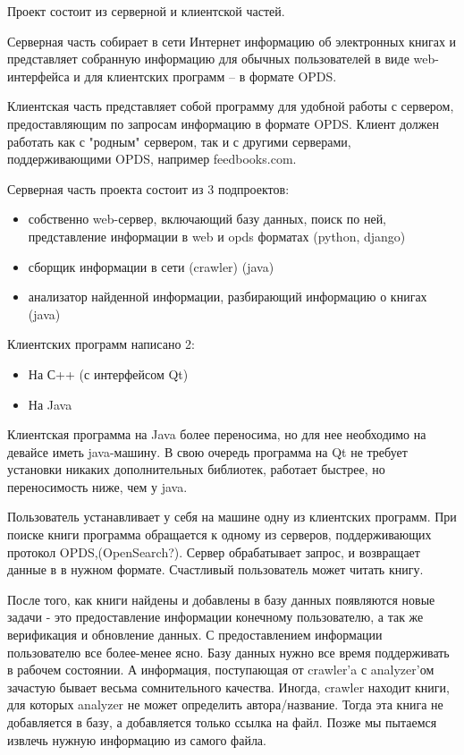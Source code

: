 \documentclass[a4paper]{report}
\begin{document}
Проект состоит из серверной и клиентской частей.

Серверная часть собирает в сети Интернет информацию об электронных книгах и представляет собранную информацию для обычных пользователей в виде web-интерфейса и для клиентских программ -- в формате OPDS.

Клиентская часть представляет собой программу для удобной работы с сервером, предоставляющим по запросам информацию в формате OPDS. Клиент должен работать как с "родным" сервером, так и с другими серверами, поддерживающими OPDS, например feedbooks.com.

Серверная часть проекта состоит из 3 подпроектов:
\begin{itemize}
\item собственно web-сервер, включающий базу данных, поиск по ней, представление информации в web и opds форматах (python, django)
\item сборщик информации в сети (crawler) (java)
\item анализатор найденной информации, разбирающий информацию о книгах (java) 
\end{itemize}
Клиентских программ написано 2:
\begin{itemize}
\item На С++ (с интерфейсом Qt)
\item На Java 
\end{itemize}

Клиентская программа на Java более переносима, но для нее необходимо на девайсе иметь java-машину. В свою очередь программа на Qt не требует установки никаких дополнительных библиотек, работает быстрее, но переносимость ниже, чем у java.
		


Пользователь устанавливает у себя на машине одну из клиентских программ. При поиске книги программа обращается к одному из серверов, поддерживающих протокол OPDS,(OpenSearch?). Сервер обрабатывает запрос, и возвращает данные в в нужном формате. Счастливый пользователь может читать книгу.



После того, как книги найдены и добавлены в базу данных появляются новые задачи - это предоставление информации конечному пользователю, а так же верификация и обновление данных. С предоставлением информации пользователю все более-менее ясно. Базу данных нужно все время поддерживать в рабочем состоянии. А информация, поступающая от crawler'a с analyzer'ом зачастую бывает весьма сомнительного качества. Иногда, crawler находит книги, для которых analyzer не может определить автора/название. Тогда эта книга не добавляется в базу, а добавляется только ссылка на файл. Позже мы пытаемся извлечь нужную информацию из самого файла.
\end{document}
